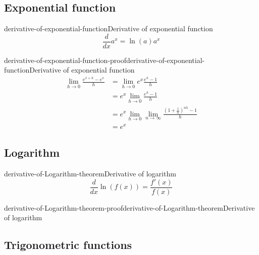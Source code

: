 \documentclass[preview]{standalone}
\begin{document}
\subsection{Exponential function}

\begin{snippettheorem}{derivative-of-exponential-function}{Derivative of exponential function}
    \todo
    \[
        \frac{d}{dx} a^x = \ln(a) a^x
    \]
\end{snippettheorem}

\begin{snippetproof}{derivative-of-exponential-function-proof}{derivative-of-exponential-function}{Derivative of exponential function}
    \todo
    \begin{align*}
        \lim_{h \to 0} \frac{e^{x+h}-e^x}{h} &= \lim_{h \to 0} e^x \frac{e^h-1}{h} \\
        &= e^x \lim_{h \to 0} \frac{e^h-1}{h} \\
        &= e^x \lim_{h \to 0} \lim_{n\to\infty} \frac{{\left(1+\frac{1}{n}\right)}^{nh}-1}{h} \\
        &= e^x
    \end{align*}
\end{snippetproof}

\subsection{Logarithm}

\begin{snippettheorem}{derivative-of-Logarithm-theorem}{Derivative of logarithm}
    \todo
    \[
        \frac{d}{dx} \ln(f(x)) = \frac{f'(x)}{f(x)}
    \]
\end{snippettheorem}

\begin{snippetproof}{derivative-of-Logarithm-theorem-proof}{derivative-of-Logarithm-theorem}{Derivative of logarithm}
    \todo
\end{snippetproof}

\subsection{Trigonometric functions}
\end{document}
